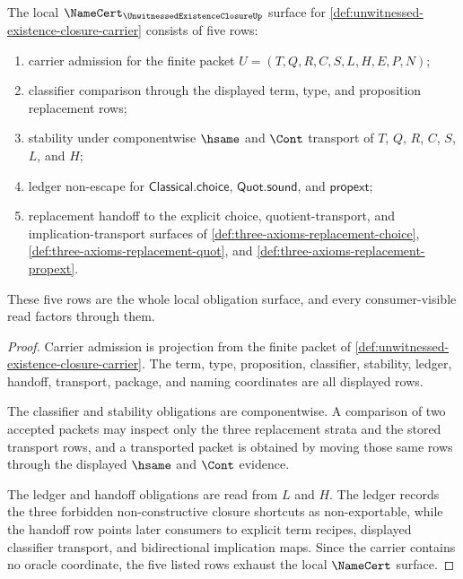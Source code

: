 \begin{theorem}
\label{thm:unwitnessed-existence-closure-namecert-obligations}
The local $\NameCert_{\UnwitnessedExistenceClosureUp}$ surface for \autoref{def:unwitnessed-existence-closure-carrier} consists of five rows:
\begin{enumerate}
\item carrier admission for the finite packet $U=(T,Q,R,C,S,L,H,E,P,N)$;
\item classifier comparison through the displayed term, type, and proposition replacement rows;
\item stability under componentwise $\hsame$ and $\Cont$ transport of $T$, $Q$, $R$, $C$, $S$, $L$, and $H$;
\item ledger non-escape for $\mathsf{Classical.choice}$, $\mathsf{Quot.sound}$, and $\mathsf{propext}$;
\item replacement handoff to the explicit choice, quotient-transport, and implication-transport surfaces of \autoref{def:three-axioms-replacement-choice}, \autoref{def:three-axioms-replacement-quot}, and \autoref{def:three-axioms-replacement-propext}.
\end{enumerate}
These five rows are the whole local obligation surface, and every consumer-visible read factors through them.
\end{theorem}
\begin{proof}
Carrier admission is projection from the finite packet of \autoref{def:unwitnessed-existence-closure-carrier}. The term, type, proposition, classifier, stability, ledger, handoff, transport, package, and naming coordinates are all displayed rows.

The classifier and stability obligations are componentwise. A comparison of two accepted packets may inspect only the three replacement strata and the stored transport rows, and a transported packet is obtained by moving those same rows through the displayed $\hsame$ and $\Cont$ evidence.

The ledger and handoff obligations are read from $L$ and $H$. The ledger records the three forbidden non-constructive closure shortcuts as non-exportable, while the handoff row points later consumers to explicit term recipes, displayed classifier transport, and bidirectional implication maps. Since the carrier contains no oracle coordinate, the five listed rows exhaust the local $\NameCert$ surface.
\end{proof}

